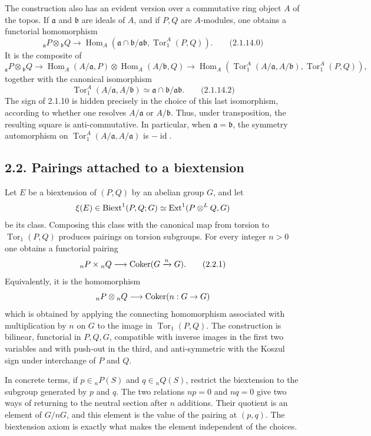 \documentclass[11pt]{article}
\providecommand{\Tor}{\operatorname{Tor}}
\providecommand{\Hom}{\operatorname{Hom}}
\providecommand{\Ext}{\operatorname{Ext}}
\providecommand{\id}{\operatorname{id}}
\begin{document}
The construction also has an evident version over a commutative ring object \(A\) of the topos.  If \(\mathfrak a\) and \(\mathfrak b\) are ideals of \(A\), and if \(P,Q\) are \(A\)-modules, one obtains a functorial homomorphism
\[
        {}_{\mathfrak a}P\otimes {}_{\mathfrak b}Q
        \longrightarrow
        \Hom_A(\mathfrak a\cap\mathfrak b/\mathfrak a\mathfrak b,\Tor_1^A(P,Q)).
\qquad\text{(2.1.14.0)}
\]
It is the composite of
\[
{}_{\mathfrak a}P\otimes {}_{\mathfrak b}Q
\longrightarrow
\Hom_A(A/\mathfrak a,P)\otimes \Hom_A(A/\mathfrak b,Q)
\longrightarrow
\Hom_A(\Tor_1^A(A/\mathfrak a,A/\mathfrak b),\Tor_1^A(P,Q)),
\]
together with the canonical isomorphism
\[
        \Tor_1^A(A/\mathfrak a,A/\mathfrak b)
        \simeq
        \mathfrak a\cap\mathfrak b/\mathfrak a\mathfrak b.
\qquad\text{(2.1.14.2)}
\]
The sign of 2.1.10 is hidden precisely in the choice of this last isomorphism, according to whether one resolves \(A/\mathfrak a\) or \(A/\mathfrak b\).  Thus, under transposition, the resulting square is anti-commutative.  In particular, when \(\mathfrak a=\mathfrak b\), the symmetry automorphism on \(\Tor_1^A(A/\mathfrak a,A/\mathfrak a)\) is \(-\id\).

\subsection*{2.2. Pairings attached to a biextension}

Let \(E\) be a biextension of \((P,Q)\) by an abelian group \(G\), and let
\[
        \xi(E)\in \Biext^1(P,Q;G)
        \simeq \Ext^1(P\otimes^L Q,G)
\]
be its class.  Composing this class with the canonical map from torsion to \(\Tor_1(P,Q)\) produces pairings on torsion subgroups.  For every integer \(n>0\) one obtains a functorial pairing
\[
        {}_nP\times {}_nQ\longrightarrow \operatorname{Coker}(G\xrightarrow{n}G).
\qquad\text{(2.2.1)}
\]
Equivalently, it is the homomorphism
\[
        {}_nP\otimes {}_nQ\longrightarrow \operatorname{Coker}(n:G\to G)
\]
which is obtained by applying the connecting homomorphism associated with multiplication by \(n\) on \(G\) to the image in \(\Tor_1(P,Q)\).  The construction is bilinear, functorial in \(P,Q,G\), compatible with inverse images in the first two variables and with push-out in the third, and anti-symmetric with the Koszul sign under interchange of \(P\) and \(Q\).

In concrete terms, if \(p\in {}_nP(S)\) and \(q\in {}_nQ(S)\), restrict the biextension to the subgroup generated by \(p\) and \(q\).  The two relations \(np=0\) and \(nq=0\) give two ways of returning to the neutral section after \(n\) additions.  Their quotient is an element of \(G/nG\), and this element is the value of the pairing at \((p,q)\).  The biextension axiom is exactly what makes the element independent of the choices.
\end{document}
